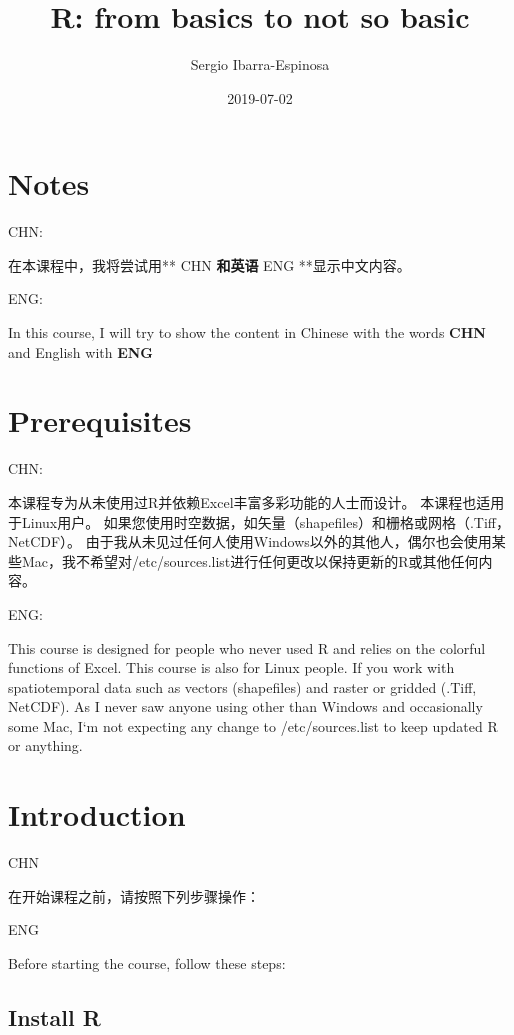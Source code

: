 \documentclass[]{book}
\title{R: from basics to not so basic}
\author{Sergio Ibarra-Espinosa}
\date{2019-07-02}
\begin{document}
\maketitle

{
\setcounter{tocdepth}{1}
\tableofcontents
}
\hypertarget{notes}{%
\chapter{Notes}\label{notes}}

CHN:

在本课程中，我将尝试用** CHN \textbf{和英语} ENG **显示中文内容。

ENG:

In this course, I will try to show the content in Chinese with the words \textbf{CHN} and English with \textbf{ENG}

\hypertarget{prerequisites}{%
\chapter{Prerequisites}\label{prerequisites}}

CHN:

本课程专为从未使用过R并依赖Excel丰富多彩功能的人士而设计。
本课程也适用于Linux用户。
如果您使用时空数据，如矢量（shapefiles）和栅格或网格（.Tiff，NetCDF）。
由于我从未见过任何人使用Windows以外的其他人，偶尔也会使用某些Mac，我不希望对/etc/sources.list进行任何更改以保持更新的R或其他任何内容。

ENG:

This course is designed for people who never used R and relies on the colorful functions of Excel.
This course is also for Linux people.
If you work with spatiotemporal data such as vectors (shapefiles) and raster or gridded (.Tiff, NetCDF).
As I never saw anyone using other than Windows and occasionally some Mac, I`m not expecting any change to /etc/sources.list to keep updated R or anything.

\hypertarget{intro}{%
\chapter{Introduction}\label{intro}}

CHN

在开始课程之前，请按照下列步骤操作：

ENG

Before starting the course, follow these steps:

\hypertarget{install-r}{%
\section{Install R}\label{install-r}}
\end{document}
